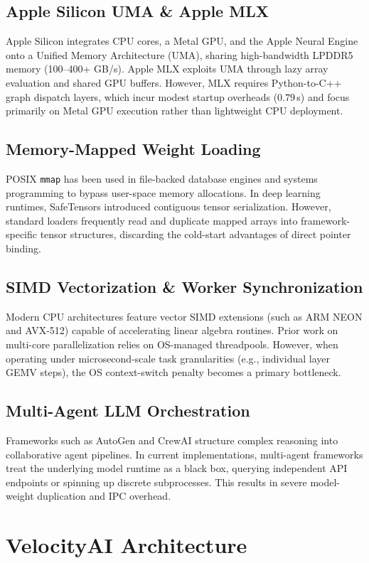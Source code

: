 \documentclass[10pt,twocolumn]{article}
\begin{document}
\subsection{Apple Silicon UMA \& Apple MLX}
Apple Silicon integrates CPU cores, a Metal GPU, and the Apple Neural Engine onto a Unified Memory Architecture (UMA), sharing high-bandwidth LPDDR5 memory (100--400+ GB/s). Apple MLX \cite{mlx} exploits UMA through lazy array evaluation and shared GPU buffers. However, MLX requires Python-to-C++ graph dispatch layers, which incur modest startup overheads ($0.79$\,s) and focus primarily on Metal GPU execution rather than lightweight CPU deployment.

\subsection{Memory-Mapped Weight Loading}
POSIX \texttt{mmap} has been used in file-backed database engines and systems programming to bypass user-space memory allocations. In deep learning runtimes, SafeTensors introduced contiguous tensor serialization. However, standard loaders frequently read and duplicate mapped arrays into framework-specific tensor structures, discarding the cold-start advantages of direct pointer binding.

\subsection{SIMD Vectorization \& Worker Synchronization}
Modern CPU architectures feature vector SIMD extensions (such as ARM NEON and AVX-512) capable of accelerating linear algebra routines. Prior work on multi-core parallelization relies on OS-managed threadpools. However, when operating under microsecond-scale task granularities (e.g., individual layer GEMV steps), the OS context-switch penalty becomes a primary bottleneck.

\subsection{Multi-Agent LLM Orchestration}
Frameworks such as AutoGen \cite{autogen} and CrewAI structure complex reasoning into collaborative agent pipelines. In current implementations, multi-agent frameworks treat the underlying model runtime as a black box, querying independent API endpoints or spinning up discrete subprocesses. This results in severe model-weight duplication and IPC overhead.

\section{VelocityAI Architecture}
\end{document}
